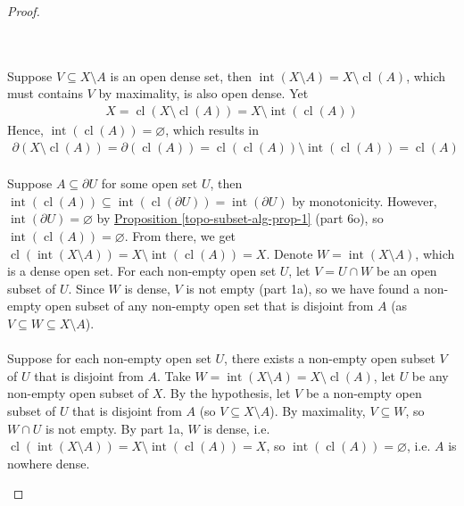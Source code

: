 \documentclass{treatise}
\begin{document}
\begin{proof}
\begin{enumerate}[label=(\alph*)]
    \\
    \\
    Suppose $V \subseteq X \setminus A$ is an open dense set, then $\operatorname{int}(X \setminus A) = X \setminus \operatorname{cl}(A)$, which must contains $V$ by maximality, is also open dense. Yet
    \begin{align*}
        X = \operatorname{cl}(X \setminus \operatorname{cl}(A)) = X \setminus \operatorname{int}(\operatorname{cl}(A))
    \end{align*}
    Hence, $\operatorname{int}(\operatorname{cl}(A)) = \varnothing$, which results in
    \begin{align*}
        \partial (X \setminus \operatorname{cl}(A)) = \partial (\operatorname{cl}(A)) = \operatorname{cl}(\operatorname{cl}(A)) \setminus \operatorname{int}(\operatorname{cl}(A)) = \operatorname{cl}(A)
    \end{align*}
    \\
    Suppose $A \subseteq \partial U$ for some open set $U$, then $\operatorname{int}(\operatorname{cl}(A)) \subseteq \operatorname{int}(\operatorname{cl}(\partial U)) = \operatorname{int}(\partial U)$ by monotonicity. However, $\operatorname{int}(\partial U) = \varnothing$ by \hyperref[topo-subset-alg-prop-1]{Proposition \ref*{topo-subset-alg-prop-1}} (part 6o), so $\operatorname{int}(\operatorname{cl}(A)) = \varnothing$. From there, we get $\operatorname{cl}(\operatorname{int}(X \setminus A)) = X \setminus \operatorname{int}(\operatorname{cl}(A)) = X$. Denote $W = \operatorname{int}(X \setminus A)$, which is a dense open set. For each non-empty open set $U$, let $V = U \cap W$ be an open subset of $U$. Since $W$ is dense, $V$ is not empty (part 1a), so we have found a non-empty open subset of any non-empty open set that is disjoint from $A$ (as $V \subseteq W \subseteq X \setminus A$).
    \\
    \\
    Suppose for each non-empty open set $U$, there exists a non-empty open subset $V$ of $U$ that is disjoint from $A$. Take $W = \operatorname{int}(X \setminus A) = X \setminus \operatorname{cl}(A)$, let $U$ be any non-empty open subset of $X$. By the hypothesis, let $V$ be a non-empty open subset of $U$ that is disjoint from $A$ (so $V \subseteq X \setminus A$). By maximality, $V \subseteq W$, so $W \cap U$ is not empty. By part 1a, $W$ is dense, i.e. $\operatorname{cl}(\operatorname{int}(X \setminus A)) = X \setminus \operatorname{int}(\operatorname{cl}(A)) = X$, so $\operatorname{int}(\operatorname{cl}(A)) = \varnothing$, i.e. $A$ is nowhere dense.

\end{enumerate}
\end{proof}
\end{document}
